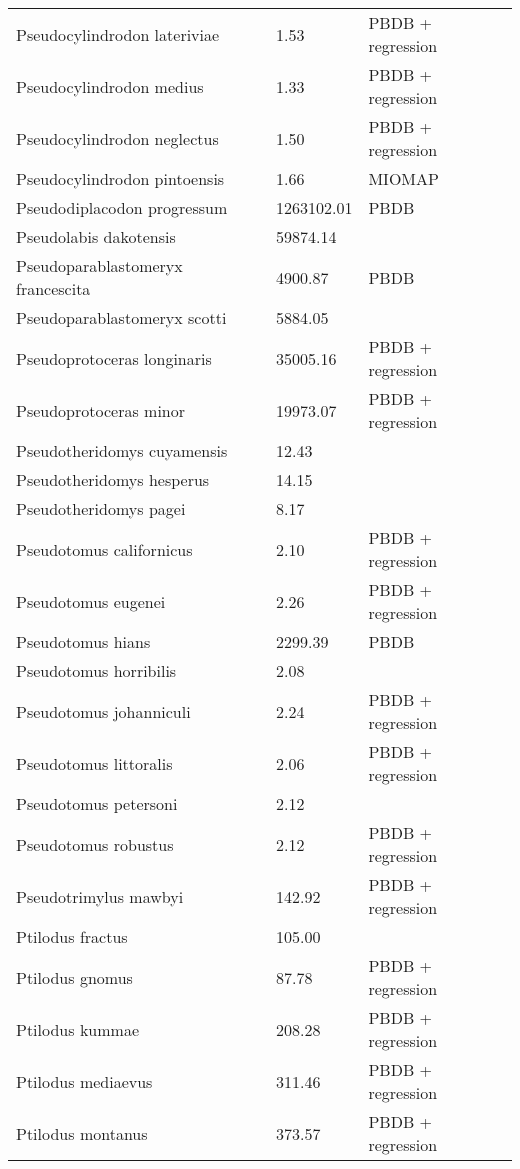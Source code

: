 \documentclass{article}
\begin{document}
\begin{center}
\begin{longtable}{p{} p{} p{}}
    Pseudocylindrodon lateriviae & 1.53 & PBDB + regression \\ 
    Pseudocylindrodon medius & 1.33 & PBDB + regression \\ 
    Pseudocylindrodon neglectus & 1.50 & PBDB + regression \\ 
    Pseudocylindrodon pintoensis & 1.66 & MIOMAP \\ 
    Pseudodiplacodon progressum & 1263102.01 & PBDB \\ 
    Pseudolabis dakotensis & 59874.14 & \cite{Tomiya2013} \\ 
    Pseudoparablastomeryx francescita & 4900.87 & PBDB \\ 
    Pseudoparablastomeryx scotti & 5884.05 & \cite{Tomiya2013} \\ 
    Pseudoprotoceras longinaris & 35005.16 & PBDB + regression \\ 
    Pseudoprotoceras minor & 19973.07 & PBDB + regression \\ 
    Pseudotheridomys cuyamensis & 12.43 & \cite{Tomiya2013} \\ 
    Pseudotheridomys hesperus & 14.15 & \cite{Tomiya2013} \\ 
    Pseudotheridomys pagei & 8.17 & \cite{Tomiya2013} \\ 
    Pseudotomus californicus & 2.10 & PBDB + regression \\ 
    Pseudotomus eugenei & 2.26 & PBDB + regression \\ 
    Pseudotomus hians & 2299.39 & PBDB \\ 
    Pseudotomus horribilis & 2.08 & \cite{Carraway2010} \\ 
    Pseudotomus johanniculi & 2.24 & PBDB + regression \\ 
    Pseudotomus littoralis & 2.06 & PBDB + regression \\ 
    Pseudotomus petersoni & 2.12 & \cite{Carraway2010} \\ 
    Pseudotomus robustus & 2.12 & PBDB + regression \\ 
    Pseudotrimylus mawbyi & 142.92 & PBDB + regression \\ 
    Ptilodus fractus & 105.00 & \cite{Wilson2012} \\ 
    Ptilodus gnomus & 87.78 & PBDB + regression \\ 
    Ptilodus kummae & 208.28 & PBDB + regression \\ 
    Ptilodus mediaevus & 311.46 & PBDB + regression \\ 
    Ptilodus montanus & 373.57 & PBDB + regression \\ 

\end{longtable}
\end{center}
\end{document}
